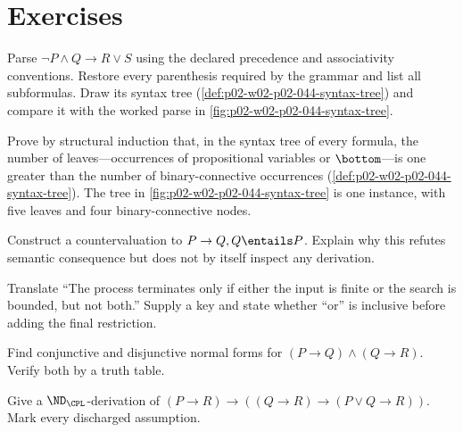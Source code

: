 \section{Exercises}
\label{sec:prop-metatheory-06}

\begin{exercise}
\label{ex:prop-metatheory-01}
Parse
\(\neg P\land Q\to R\lor S\) using the declared precedence and associativity
conventions.  Restore every parenthesis required by the grammar and list all
subformulas.  Draw its syntax tree
(\cref{def:p02-w02-p02-044-syntax-tree}) and compare it with the worked parse
in \cref{fig:p02-w02-p02-044-syntax-tree}.
\end{exercise}

\begin{exercise}
\label{ex:prop-metatheory-02}
Prove by structural induction that, in the syntax tree of every formula, the
number of leaves---occurrences of propositional variables or \(\bottom\)---is
one greater than the number of binary-connective occurrences
(\cref{def:p02-w02-p02-044-syntax-tree}).  The tree in
\cref{fig:p02-w02-p02-044-syntax-tree} is one instance, with five leaves and
four binary-connective nodes.
\end{exercise}

\begin{exercise}
\label{ex:prop-metatheory-03}
Construct a countervaluation to
\(P\to Q,Q\entails P\).  Explain why this refutes semantic consequence but
does not by itself inspect any derivation.
\end{exercise}

\begin{exercise}
\label{ex:prop-metatheory-04}
Translate ``The process terminates only if either the input is finite or the
search is bounded, but not both.''  Supply a key and state whether ``or'' is
inclusive before adding the final restriction.
\end{exercise}

\begin{exercise}
\label{ex:prop-metatheory-05}
Find conjunctive and disjunctive normal forms for
\((P\to Q)\land(Q\to R)\).  Verify both by a truth table.
\end{exercise}

\begin{exercise}
\label{ex:prop-metatheory-06}
Give a \(\ND_{\CPL}\)-derivation of
\((P\to R)\to((Q\to R)\to(P\lor Q\to R))\).
Mark every discharged assumption.
\end{exercise}

